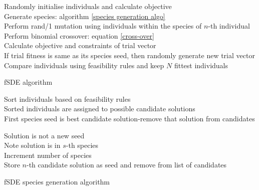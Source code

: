 \begin{algorithm}
\SetAlgoNoLine
 Randomly initialise individuals and calculate objective\\
 {
 Generate species: algorithm \ref{species generation algo} \\
  {
  Perform rand/1 mutation using individuals within the species of $n$-th individual \\
  Perform binomial crossover: equation \ref{cross-over}\\
  Calculate objective and constraints of trial vector\\
  If trial fitness is same as its species seed, then randomly generate new trial vector
  }
 Compare individuals using feasibility rules and keep $N$ fittest individuals
 }
 \caption{fSDE algorithm}
 \label{fSDE algorithm}
\end{algorithm}

\begin{algorithm}
\SetAlgoNoLine
 Sort individuals based on feasibility rules\\
 Sorted individuals are assigned to possible candidate solutions\\
 First species seed is best candidate solution-remove that solution from candidates\\
  {
  {
  {
  Solution is not a new seed\\
  Note solution is in $s$-th species\\
  }
  }
  {
  Increment number of species \\
  Store $n$-th candidate solution as seed and remove from list of candidates\\
  }

  }
 
 \caption{fSDE species generation algorithm}
 \label{species generation algo}
\end{algorithm}